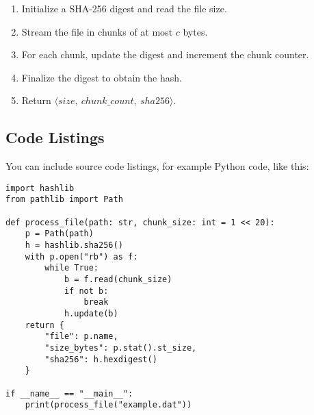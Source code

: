 \begin{enumerate}
  \item Initialize a SHA-256 digest and read the file size.
  \item Stream the file in chunks of at most $c$ bytes.
  \item For each chunk, update the digest and increment the chunk counter.
  \item Finalize the digest to obtain the hash.
  \item Return $\langle size,\ chunk\_count,\ sha256 \rangle$.
\end{enumerate}

\subsection{Code Listings}

You can include source code listings, for example Python code, like this:

\begin{lstlisting}[float=htb, caption={Source code of the file processing algorithm.}, label={lst:filehash}]
import hashlib
from pathlib import Path

def process_file(path: str, chunk_size: int = 1 << 20):
    p = Path(path)
    h = hashlib.sha256()
    with p.open("rb") as f:
        while True:
            b = f.read(chunk_size)
            if not b:
                break
            h.update(b)
    return {
        "file": p.name,
        "size_bytes": p.stat().st_size,
        "sha256": h.hexdigest()
    }

if __name__ == "__main__":
    print(process_file("example.dat"))
\end{lstlisting}
